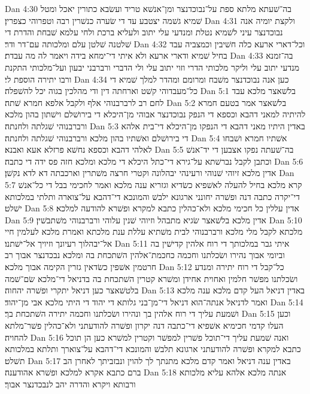 Dan 4:30  בה־שׁעתא מלתא ספת על־נבוכדנצר ומן־אנשׁא טריד ועשׂבא כתורין יאכל ומטל שׁמיא גשׁמה יצטבע עד די שׂערה כנשׁרין רבה וטפרוהי כצפרין׃
Dan 4:31  ולקצת יומיה אנה נבוכדנצר עיני לשׁמיא נטלת ומנדעי עלי יתוב ולעליא ברכת ולחי עלמא שׁבחת והדרת די שׁלטנה שׁלטן עלם ומלכותה עם־דר ודר׃
Dan 4:32  וכל־דארי ארעא כלה חשׁיבין וכמצביה עבד בחיל שׁמיא ודארי ארעא ולא איתי די־ימחא בידה ויאמר לה מה עבדת׃
Dan 4:33  בה־זמנא מנדעי יתוב עלי וליקר מלכותי הדרי וזוי יתוב עלי ולי הדברי ורברבני יבעון ועל־מלכותי התקנת ורבו יתירה הוספת לי׃
Dan 4:34  כען אנה נבוכדנצר משׁבח ומרומם ומהדר למלך שׁמיא די כל־מעבדוהי קשׁט וארחתה דין ודי מהלכין בגוה יכל להשׁפלה׃
Dan 5:1  בלשׁאצר מלכא עבד לחם רב לרברבנוהי אלף ולקבל אלפא חמרא שׁתה׃
Dan 5:2  בלשׁאצר אמר בטעם חמרא להיתיה למאני דהבא וכספא די הנפק נבוכדנצר אבוהי מן־היכלא די בירושׁלם וישׁתון בהון מלכא ורברבנוהי שׁגלתה ולחנתה׃
Dan 5:3  באדין היתיו מאני דהבא די הנפקו מן־היכלא די־בית אלהא די בירושׁלם ואשׁתיו בהון מלכא ורברבנוהי שׁגלתה ולחנתה׃
Dan 5:4  אשׁתיו חמרא ושׁבחו לאלהי דהבא וכספא נחשׁא פרזלא אעא ואבנא׃
Dan 5:5  בה־שׁעתה נפקו אצבען די יד־אנשׁ וכתבן לקבל נברשׁתא על־גירא די־כתל היכלא די מלכא ומלכא חזה פס ידה די כתבה׃
Dan 5:6  אדין מלכא זיוהי שׁנוהי ורעינהי יבהלונה וקטרי חרצה משׁתרין וארכבתה דא לדא נקשׁן׃
Dan 5:7  קרא מלכא בחיל להעלה לאשׁפיא כשׂדיא וגזריא ענה מלכא ואמר לחכימי בבל די כל־אנשׁ די־יקרה כתבה דנה ופשׁרה יחונני ארגונא ילבשׁ והמונכא די־דהבא על־צוארה ותלתי במלכותא ישׁלט׃
Dan 5:8  אדין עללין כל חכימי מלכא ולא־כהלין כתבא למקרא ופשׁרא להודעה למלכא׃
Dan 5:9  אדין מלכא בלשׁאצר שׂגיא מתבהל וזיוהי שׁנין עלוהי ורברבנוהי משׁתבשׁין׃
Dan 5:10  מלכתא לקבל מלי מלכא ורברבנוהי לבית משׁתיא עללת ענת מלכתא ואמרת מלכא לעלמין חיי אל־יבהלוך רעיונך וזיויך אל־ישׁתנו׃
Dan 5:11  איתי גבר במלכותך די רוח אלהין קדישׁין בה וביומי אבוך נהירו ושׂכלתנו וחכמה כחכמת־אלהין השׁתכחת בה ומלכא נבכדנצר אבוך רב חרטמין אשׁפין כשׂדאין גזרין הקימה אבוך מלכא׃
Dan 5:12  כל־קבל די רוח יתירה ומנדע ושׂכלתנו מפשׁר חלמין ואחוית אחידן ומשׁרא קטרין השׁתכחת בה בדניאל די־מלכא שׂם־שׁמה בלטשׁאצר כען דניאל יתקרי ופשׁרה יהחוה׃
Dan 5:13  באדין דניאל העל קדם מלכא ענה מלכא ואמר לדניאל אנתה־הוא דניאל די־מן־בני גלותא די יהוד די היתי מלכא אבי מן־יהוד׃
Dan 5:14  ושׁמעת עליך די רוח אלהין בך ונהירו ושׂכלתנו וחכמה יתירה השׁתכחת בך׃
Dan 5:15  וכען העלו קדמי חכימיא אשׁפיא די־כתבה דנה יקרון ופשׁרה להודעתני ולא־כהלין פשׁר־מלתא להחויה׃
Dan 5:16  ואנה שׁמעת עליך די־תוכל פשׁרין למפשׁר וקטרין למשׁרא כען הן תוכל כתבא למקרא ופשׁרה להודעתני ארגונא תלבשׁ והמונכא די־דהבא על־צוארך ותלתא במלכותא תשׁלט׃
Dan 5:17  באדין ענה דניאל ואמר קדם מלכא מתנתך לך להוין ונבזביתך לאחרן הב ברם כתבא אקרא למלכא ופשׁרא אהודענה׃
Dan 5:18  אנתה מלכא אלהא עליא מלכותא ורבותא ויקרא והדרה יהב לנבכדנצר אבוך׃
